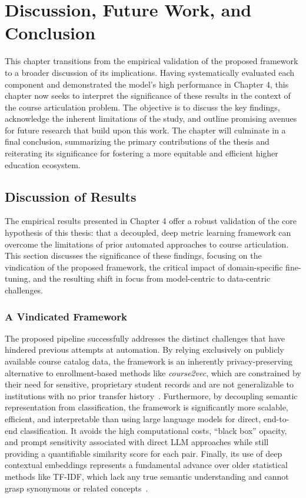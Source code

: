 \chapter{Discussion, Future Work, and Conclusion}
This chapter transitions from the empirical validation of the proposed framework to a broader discussion of its implications. Having systematically evaluated each component and demonstrated the model's high performance in Chapter 4, this chapter now seeks to interpret the significance of these results in the context of the course articulation problem. The objective is to discuss the key findings, acknowledge the inherent limitations of the study, and outline promising avenues for future research that build upon this work. The chapter will culminate in a final conclusion, summarizing the primary contributions of the thesis and reiterating its significance for fostering a more equitable and efficient higher education ecosystem.

\section{Discussion of Results}\label{ch:5.1}
The empirical results presented in Chapter 4 offer a robust validation of the core hypothesis of this thesis: that a decoupled, deep metric learning framework can overcome the limitations of prior automated approaches to course articulation. This section discusses the significance of these findings, focusing on the vindication of the proposed framework, the critical impact of domain-specific fine-tuning, and the resulting shift in focus from model-centric to data-centric challenges.

\subsection{A Vindicated Framework}\label{ch:5.1.1}
The proposed pipeline successfully addresses the distinct challenges that have hindered previous attempts at automation. By relying exclusively on publicly available course catalog data, the framework is an inherently privacy-preserving alternative to enrollment-based methods like \emph{course2vec}, which are constrained by their need for sensitive, proprietary student records and are not generalizable to institutions with no prior transfer history~\cite{pardos2018connectionistrecommendationwildutility, slade10.1177/0002764213479366}. Furthermore, by decoupling semantic representation from classification, the framework is significantly more scalable, efficient, and interpretable than using large language models for direct, end-to-end classification. It avoids the high computational costs, ``black box'' opacity, and prompt sensitivity associated with direct LLM approaches while still providing a quantifiable similarity score for each pair. Finally, its use of deep contextual embeddings represents a fundamental advance over older statistical methods like TF-IDF, which lack any true semantic understanding and cannot grasp synonymous or related concepts~\cite{AIZAWA200345}.

